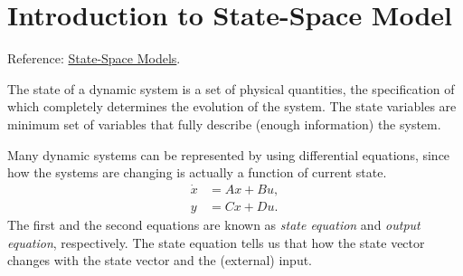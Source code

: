 \section{Introduction to State-Space Model}
\label{state:sec:ssm}
Reference: \href{http://apmonitor.com/pdc/index.php/Main/StateSpaceModel}{State-Space Models}.

The state of a dynamic system is a set of physical quantities, the specification of which completely determines the evolution of the system. The state variables are minimum set of variables that fully describe (enough information) the system. 

Many dynamic systems can be represented by using differential equations, since how the systems are changing is actually a function of current state. 
\begin{align*}
	\dot{x} &= {A}x+{B}u,\\
	y &= {C}x+Du.
\end{align*}
The first and the second equations are known as \textit{state equation} and \textit{output equation}, respectively. The state equation tells us that how the state vector changes with the state vector and the (external) input. 

